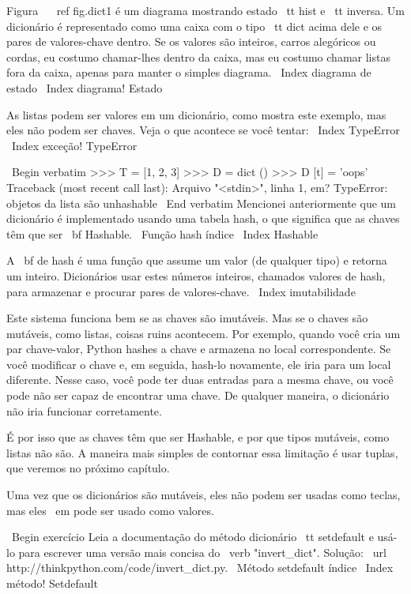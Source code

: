 \documentclass[10pt]{book}
\begin{document}
\begin {itemize}
{{{{{{{Figura ~ \ ref {} fig.dict1 é um diagrama mostrando estado {\ tt hist} e {\ tt inversa}.
Um dicionário é representado como uma caixa com o tipo {\ tt dict} acima dele
e os pares de valores-chave dentro. Se os valores são inteiros, carros alegóricos ou
cordas, eu costumo chamar-lhes dentro da caixa, mas eu costumo chamar listas
fora da caixa, apenas para manter o simples diagrama.
\ Index {diagrama de estado}
\ Index {diagrama! Estado}

As listas podem ser valores em um dicionário, como mostra este exemplo, mas eles
não podem ser chaves. Veja o que acontece se você tentar:
\ Index {} TypeError
\ Index {exceção! TypeError}


\ Begin {verbatim}
>>> T = [1, 2, 3]
>>> D = dict ()
>>> D [t] = 'oops'
Traceback (most recent call last):
  Arquivo "<stdin>", linha 1, em?
TypeError: objetos da lista são unhashable
\ End {verbatim}
%
Mencionei anteriormente que um dicionário é implementado usando
uma tabela hash, o que significa que as chaves têm que ser {\ bf Hashable}.
\ {Função hash} índice
\ Index {} Hashable

A {\ bf de hash} é uma função que assume um valor (de qualquer tipo)
e retorna um inteiro. Dicionários usar estes números inteiros,
chamados valores de hash, para armazenar e procurar pares de valores-chave.
\ Index {imutabilidade}

Este sistema funciona bem se as chaves são imutáveis. Mas se o
chaves são mutáveis, como listas, coisas ruins acontecem. Por exemplo,
quando você cria um par chave-valor, Python hashes a chave e 
armazena no local correspondente. Se você modificar o
chave e, em seguida, hash-lo novamente, ele iria para um local diferente.
Nesse caso, você pode ter duas entradas para a mesma chave,
ou você pode não ser capaz de encontrar uma chave. De qualquer maneira, o
dicionário não iria funcionar corretamente.

É por isso que as chaves têm que ser Hashable, e por que tipos mutáveis, como
listas não são. A maneira mais simples de contornar essa limitação é
usar tuplas, que veremos no próximo capítulo.

Uma vez que os dicionários são mutáveis, eles não podem ser usadas como teclas,
mas eles {\ em} pode ser usado como valores.

\ Begin {} exercício
Leia a documentação do método dicionário {\ tt setdefault}
e usá-lo para escrever uma versão mais concisa do \ verb "invert_dict".
Solução: \ url {http://thinkpython.com/code/invert_dict.py}.
\ {Método setdefault} índice
\ Index {método! Setdefault}

}}}}}}}
\end{itemize}
\end{document}

